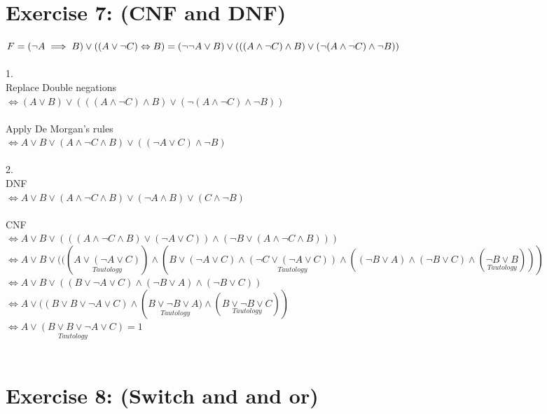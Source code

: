 \documentclass[12pt]{article}
\begin{document}
\section*{Exercise 7: (CNF and DNF)}
$ F = (\lnot A \implies B) \lor ((A \lor \lnot C) \Leftrightarrow B)\\
 = (\lnot\lnot A \lor B) \lor (((A \land \lnot C)\land B) \lor (\lnot(A\land \lnot C)\land \lnot B)) $\\ \\ 
1. \\
 Replace Double negations\\
 $\Leftrightarrow (A \lor B) \lor (((A \land \lnot C)\land B) \lor (\lnot(A\land \lnot C)\land \lnot B))$\\ \\
 Apply De Morgan's rules\\
 $\Leftrightarrow A \lor B \lor (A \land \lnot C \land B) \lor ((\lnot A \lor C) \land \lnot B)$\\ \\
2. \\
DNF\\
$\Leftrightarrow A \lor B \lor (A \land \lnot C \land B) \lor  (\lnot A \land B) \lor (C \land \lnot B)$ \\ \\
CNF\\
 $\Leftrightarrow A \lor B \lor 
 (((A \land \lnot C \land B) \lor (\lnot A \lor C)) \land (\lnot B \lor (A \land \lnot C \land B)))$\\
 $\Leftrightarrow A \lor B \lor 
 (((\underset{Tautology}{A \lor (\lnot A \lor C)}) \land (B \lor (\lnot A \lor C) \land \underset{Tautology}{(\lnot C \lor (\lnot A \lor C))} \land ((\lnot B \lor A) \land (\lnot B \lor C) \land (\underset{Tautology}{\lnot B \lor B})))$\\
 $\Leftrightarrow A \lor B \lor 
 ((B \lor \lnot A \lor C) \land (\lnot B \lor A) \land (\lnot B \lor C))$\\
$\Leftrightarrow A \lor ((B \lor B \lor \lnot A \lor C) \land (\underset{Tautology}{B \lor \lnot B \lor A)} \land (\underset{Tautology}{B \lor \lnot B \lor C}))$\\
$\Leftrightarrow \underset{Tautology}{A \lor (B \lor B \lor \lnot A \lor C)} = 1$\\ \\

\section*{Exercise 8: (Switch and and or)}

\end{document}
